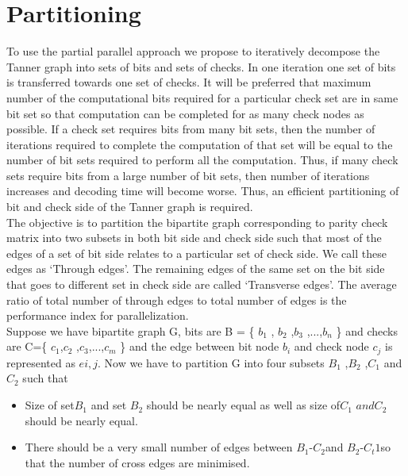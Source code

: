 \section{Partitioning}
To use the partial parallel approach we propose to iteratively decompose the Tanner graph into sets of bits and sets of checks. In one iteration one set of bits is transferred towards one set of checks. It will be preferred that maximum number of the computational bits required for a particular check set are in same bit set so that computation can be completed for as many check nodes as possible. If a check set requires bits from many bit sets, then the number of iterations required to complete the computation of that set will be equal to the number of bit sets required to perform all the computation. Thus, if many check sets require bits from a large number of bit sets, then number of iterations increases and decoding time will become worse. Thus, an efficient partitioning of bit and check side of the Tanner graph is required. \\
The objective is to partition the bipartite graph corresponding to parity check matrix into two subsets in both bit side and check side such that most of the edges of a set of bit side relates to a particular set of check side. We call these edges as \lq Through edges\rq. The remaining edges of the same set on the bit side that goes to different set in check side are called \lq Transverse edges\rq. The average ratio of total number
of through edges to total number of edges is the performance index for parallelization. \\
Suppose we have bipartite graph G, bits are
B = \{ $b_{1}$ , $ b_{2}$ ,$b_{3}$ ,...,$b_{n}$ \} and checks are C=\{ $c_{1}$,$c_{2}$ ,$c_{3}$,...,$c_{m}$ \}
and the edge between bit node $b_{i}$ and check node $c_{j}$ is represented as $e{i,j}$. Now we have to partition G into four subsets $B_{1}$ ,$B_{2}$ ,$C_{1}$ and $C_{2}$ such that
\begin{itemize}
\item   Size of set$ B_{1}$ and set $B_{2}$ should be nearly equal as well
as size of$ C_{1}$ $and C_{2}$ should be nearly equal.
\item  There should be a very small number of edges between
$B_{1}$-$C_{2}$and $B_{2}$-$C_t{1}$so that the number of cross edges are minimised. 
\end{itemize}


